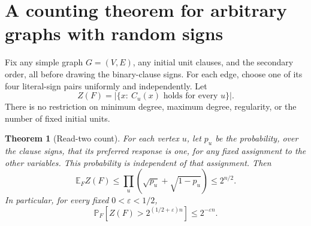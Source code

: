 \documentclass[11pt,a4paper]{article}
\newtheorem{theorem}{Theorem}
\theoremstyle{remark}
\newcommand{\E}{\mathbb E}
\newcommand{\Prb}{\mathbb P}
\begin{document}
\section{A counting theorem for arbitrary graphs with random signs}
\label{sec:random}

Fix any simple graph $G=(V,E)$, any initial unit clauses, and the secondary
order, all before drawing the binary-clause signs. For each edge, choose
one of its four literal-sign pairs uniformly and independently. Let
\[
 Z(F)=\left|\{x:\ C_u(x)\text{ holds for every }u\}\right|.
\]
There is no restriction on minimum degree, maximum degree, regularity,
or the number of fixed initial units.

\begin{theorem}[Read-two count]\label{thm:random}
For each vertex $u$, let $p_u$ be the probability, over the clause signs,
that its preferred response is one, for any fixed assignment to the
other variables. This probability is independent of that assignment.
Then
\begin{equation}
 \boxed{\E_F Z(F)
 \le \prod_u\left(\sqrt{p_u}+\sqrt{1-p_u}\right)
 \le 2^{n/2}.}                                  \label{eq:randomcount}
\end{equation}
In particular, for every fixed $0<\varepsilon<1/2$,
\begin{equation}
 \Prb_F\left[Z(F)>2^{(1/2+\varepsilon)n}\right]
 \le 2^{-\varepsilon n}.                        \label{eq:randomtail}
\end{equation}
\end{theorem}
\end{document}
